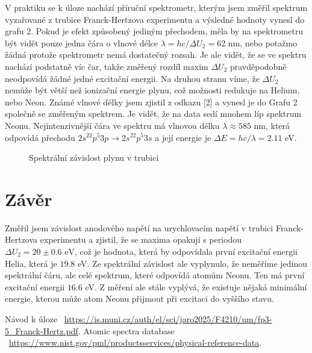 \documentclass[a4paper,11pt]{article}
\begin{document}
V praktiku se k úloze nachází příruční spektrometr, kterým jsem změřil spektrum vyzařované z trubice Franck-Hertzova experimentu a výsledné hodnoty vynesl do grafu 2. Pokud je efekt způsobený jediným přechodem, měla by na spektrometru být vidět pouze jedna čára o vlnové délce $ \lambda = hc / \Delta U_2 = 62 $ nm, nebo potažmo žádná protože spektrometr nemá dostatečný rozsah. Je ale vidět, že se ve spektru nachází podstatně víc čar, takže změřený rozdíl maxim $ \Delta U_2 $ pravděpodobně neodpovídá žádné jedné excitační energii. Na druhou stranu víme, že $ \Delta U_2 $ nemůže být větší než ionizační energie plynu, což možnosti redukuje na Helium, nebo Neon. Známé vlnové délky jsem zjistil z odkazu [2] a vynesl je do Grafu 2 společně se změřeným spektrem. Je vidět, že na data sedí mnohem líp spektrum Neonu. Nejintenzivnější čára ve spektru má vlnovou délku $ \lambda \approx 585 $ nm, která odpovídá přechodu $ 2s^22p^{5}3p \to  2s^22p^{5}3s $ a její energie je $ \Delta E = hc / \lambda = 2.11 $ eV. 

\vspace{-1pt}

\begin{figure}[htpb]
    \centering
    
    \captionsetup{type=graph}
    \caption{Spektrální závislost plynu v trubici}
\end{figure}

\section{Závěr}

Změřil jsem závislost anodového napětí na urychlovacím napětí v trubici Franck-Hertzova experimentu a zjistil, že se maxima opakují s periodou $ \Delta U_2 = 20 \pm 0.6 \text{ eV} $, což je hodnota, která by odpovídala první excitační energii Helia, která je $ 19.8 $ eV. Ze spektrální závislost ale vyplynulo, že neměříme jedinou spektrální čáru, ale celé spektrum, které odpovídá atomům Neonu. Ten má první excitační energii $ 16.6 $ eV. Z měření ale stále vyplývá, že existuje nějaká minimální energie, kterou může atom Neonu přijmout při excitaci do vyššího stavu.  

\begin{thebibliography}{0}
 Návod k úloze ~\url{https://is.muni.cz/auth/el/sci/jaro2025/F4210/um/fp3-5_Franck-Hertz.pdf}.   
 Atomic spectra database  \\ ~\url{https://www.nist.gov/pml/productsservices/physical-reference-data}.   
\end{thebibliography}
\end{document}
